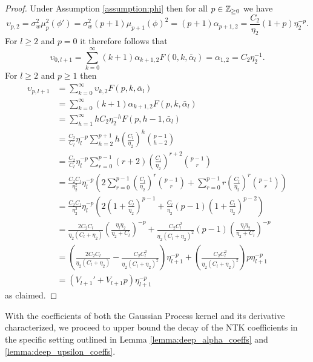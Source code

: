 \begin{proof}
    Under Assumption \ref{assumption:phi} then for all $p\in \mathbb{Z}_{\geq 0}$ we have
    \[
        \upsilon_{p,2} = \sigma_w^2 \mu_p^2(\phi') = \sigma_w^2 (p + 1) \mu_{p + 1}(\phi)^2 = (p+1)\alpha_{p+1,2} = \frac{C_2}{\eta_2}(1+ p) \eta_2^{-p}.
    \]
    For $l\geq 2$ and $p=0$ it therefore follows that
    \[
        \upsilon_{0,l+1} =  \sum_{k=0}^{\infty}(k+1)\alpha_{k+1,2} F(0,k,\bar{\alpha}_l)  = \alpha_{1,2} = C_2 \eta_2^{-1}.
    \]
    For $l\geq 2$ and $p\geq 1$ then
    \[
    \begin{aligned}
         \upsilon_{p,l+1} &= \sum_{k=0}^{\infty} \upsilon_{k,2} F(p,k,\bar{\alpha}_l)\\
         &= \sum_{k=0}^{\infty}(k+1)\alpha_{k+1,2} F(p,k,\bar{\alpha}_l)\\
        &= \sum_{h=1}^{\infty} h C_2 \eta_2^{-h} F(p,h-1,\bar{\alpha}_l)\\
        &=  \frac{C_2 }{C_l} \eta_l^{-p} \sum_{h=2}^{p+1} h \left(\frac{C_l}{\eta_2 }\right)^{ h}\binom{p-1}{h-2}\\
        & = \frac{C_2 }{C_l} \eta_l^{-p} \sum_{r=0}^{p-1} (r+2) \left(\frac{C_l}{\eta_2 }\right)^{ r+2}\binom{p-1}{r}\\
        & =  \frac{C_2 C_l}{\eta_2^2} \eta_l^{-p}\left(2 \sum_{r=0}^{p-1} \left(\frac{C_l}{\eta_2 }\right)^{ r}\binom{p-1}{r}   + \sum_{r=0}^{p-1} r \left(\frac{C_l}{\eta_2 }\right)^{ r}\binom{p-1}{r}\right)\\
        &=\frac{C_2 C_l}{\eta_2^2} \eta_l^{-p}\left(2 \left(1+ \frac{C_l}{\eta_2} \right)^{p-1} + \frac{C_l}{\eta_2}(p-1)\left(1 + \frac{C_l}{\eta_2} \right)^{p-2}\right)\\
        &= \frac{2C_2 C_l}{\eta_2(C_l + \eta_2)}\left(\frac{\eta_l \eta_2}{\eta_2 + C_l}\right)^{-p} + \frac{C_2C_l^2}{\eta_2( C_l + \eta_2)^2} (p-1) \left(\frac{\eta_l \eta_2}{\eta_2 + C_l}\right)^{-p}\\
        & = \left(\frac{2C_2 C_l}{\eta_2(C_l + \eta_2)} - \frac{C_2C_l^2}{\eta_2( C_l + \eta_2)^2} \right) \eta_{l+1}^{-p} + \left( \frac{C_2C_l^2}{\eta_2( C_l + \eta_2)^2}\right) p \eta_{l+1}^{-p}\\
        & = (V_{l+1}' + V_{l+1} p)\eta_{l+1}^{-p}
    \end{aligned}
    \]
    as claimed.
\end{proof}
With the coefficients of both the Gaussian Process kernel and its derivative characterized, we proceed to upper bound the decay of the NTK coefficients in the specific setting outlined in Lemma \ref{lemma:deep_alpha_coeffs} and \ref{lemma:deep_upsilon_coeffs}.

